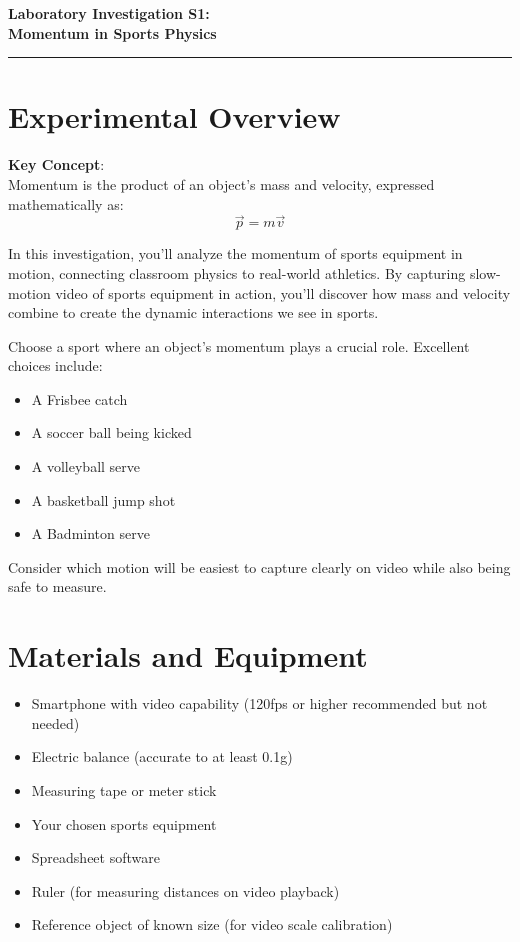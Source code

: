 \documentclass[12pt]{article}
\begin{document}
\begin{center}
{\Large \textbf{Laboratory Investigation S1:}}\\[0.5cm]
{\LARGE \textbf{Momentum in Sports Physics}}\\[1cm]
\rule{\textwidth}{0.4pt}
\end{center}

\section*{Experimental Overview}

\textbf{Key Concept}:\\
Momentum is the product of an object's mass and velocity, expressed mathematically as: $$\vec{p} = m\vec{v}$$

In this investigation, you'll analyze the momentum of sports equipment in motion, connecting classroom physics to real-world athletics. By capturing slow-motion video of sports equipment in action, you'll discover how mass and velocity combine to create the dynamic interactions we see in sports.

\begin{tcolorbox}[colback=conceptgreen!10,colframe=conceptgreen,title=\textbf{Investigation Strategy}]
Choose a sport where an object's momentum plays a crucial role. Excellent choices include:
\begin{itemize}
\item A Frisbee catch
\item A soccer ball being kicked
\item A volleyball serve
\item A basketball jump shot
\item A Badminton serve
\end{itemize}
Consider which motion will be easiest to capture clearly on video while also being safe to measure.
\end{tcolorbox}

\section*{Materials and Equipment}
\begin{itemize}
\item Smartphone with video capability (120fps or higher recommended but not needed)
\item Electric balance (accurate to at least 0.1g)
\item Measuring tape or meter stick
\item Your chosen sports equipment
\item Spreadsheet software
\item Ruler (for measuring distances on video playback)
\item Reference object of known size (for video scale calibration)
\end{itemize}
\end{document}
